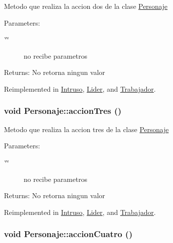 Metodo que realiza la accion dos de la clase \hyperlink{classPersonaje}{Personaje} \begin{Desc}
\item[Parameters:]
\begin{description}
\item[{\em \char`\"{}\char`\"{}}]no recibe parametros \end{description}
\end{Desc}
\begin{Desc}
\item[Returns:]No retorna ningun valor \end{Desc}


Reimplemented in \hyperlink{classIntruso_6fef0ae823fdabc05796413f53d073e5}{Intruso}, \hyperlink{classLider_51fb2d9c6dfe283a13d61b8f546068f3}{Lider}, and \hyperlink{classTrabajador_598df69f74628e4da5d0dc776c98b114}{Trabajador}.\hypertarget{classPersonaje_85c25ff0362bf4f4f5e69965c1ae4cfb}{
\subsubsection[accionTres]{\setlength{\rightskip}{0pt plus 5cm}void Personaje::accionTres ()}}
\label{classPersonaje_85c25ff0362bf4f4f5e69965c1ae4cfb}


Metodo que realiza la accion tres de la clase \hyperlink{classPersonaje}{Personaje} \begin{Desc}
\item[Parameters:]
\begin{description}
\item[{\em \char`\"{}\char`\"{}}]no recibe parametros \end{description}
\end{Desc}
\begin{Desc}
\item[Returns:]No retorna ningun valor \end{Desc}


Reimplemented in \hyperlink{classIntruso_52e521cc66983d5a9f20f3424818e6e4}{Intruso}, \hyperlink{classLider_993a29f5a5615bd8a41dfe550dfccb61}{Lider}, and \hyperlink{classTrabajador_9203576ae93a8854b033f1d91e25fee7}{Trabajador}.\hypertarget{classPersonaje_3aed5959a6a829819e0b0a6dcca9c2e4}{
\subsubsection[accionCuatro]{\setlength{\rightskip}{0pt plus 5cm}void Personaje::accionCuatro ()}}
\label{classPersonaje_3aed5959a6a829819e0b0a6dcca9c2e4}



